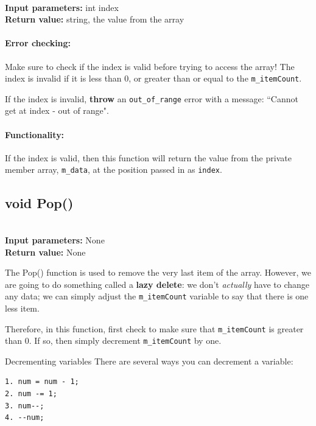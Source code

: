 \documentclass[a4paper,12pt]{book}
\begin{document}
    \begin{framed} ~\\
        \textbf{Input parameters:} int index \\
        \textbf{Return value:} string, the value from the array
    \end{framed}

    \paragraph{Error checking:} Make sure to check if the index is valid
    before trying to access the array! The index is invalid if it is
    less than 0, or greater than or equal to the \texttt{m\_itemCount}.

    If the index is invalid, \textbf{throw} an \texttt{out\_of\_range}
    error with a message: ``Cannot get at index - out of range".

    \paragraph{Functionality:} If the index is valid, then this function
    will return the value from the private member array, \texttt{m\_data},
    at the position passed in as \texttt{index}.
    
    \hrulefill
    \subsection*{void Pop()}

    \begin{framed} ~\\
        \textbf{Input parameters:} None \\
        \textbf{Return value:} None
    \end{framed}

    The Pop() function is used to remove the very last item of the array.
    However, we are going to do something called a \textbf{lazy delete}:
    we don't \textit{actually} have to change any data; we can simply adjust
    the \texttt{m\_itemCount} variable to say that there is one less item.

    Therefore, in this function, first check to make sure that \texttt{m\_itemCount}
    is greater than 0. If so, then simply decrement \texttt{m\_itemCount} by one.

    \begin{hint}{Decrementing variables}
        There are several ways you can decrement a variable:
\begin{verbatim}
1. num = num - 1;
2. num -= 1;
3. num--;
4. --num;
\end{verbatim}
    \end{hint}
    
\end{document}
